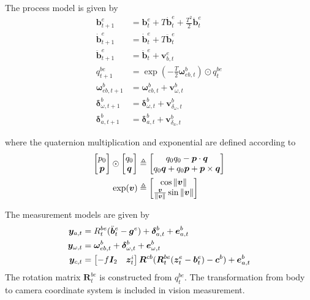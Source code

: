 The process model is given by
\begin{subequations}\label{eq:proc1}
	\begin{align}
	\bm{b}_{t+1}^{e} &= \bm{b}_{t}^{e} + T \dot{\bm{b}}_{t}^{e} + \tfrac {T^{2}} {2} \ddot{\bm{b}}_{t}^{e} \\
	\dot{\bm{b}}_{t+1}^{e} &= \dot{\bm{b}}_{t}^{e} + T \ddot{\bm{b}}_{t}^{e} \\
	\ddot{\bm{b}}_{t+1}^{e} &= \ddot{\bm{b}}_{t}^{e} + \bm{v}_{b,t}^{e} \\
	q_{t+1}^{be} &= \exp( -\tfrac{T}{2} \bm{\omega}_{eb,t}^{b} ) \odot q_{t}^{be} \\
	\bm{\omega}_{eb,t+1}^{b} &= \bm{\omega}_{eb,t}^{b} + \bm{v}_{\omega,t}^{b} \\
	\bm{\delta}_{\omega,t+1}^{b} &= \bm{\delta}_{\omega,t}^{b} + \bm{v}_{\delta_{\omega},t}^{b} \\
	\bm{\delta}_{a,t+1}^{b} &= \bm{\delta}_{a,t}^{b} + \bm{v}_{\delta_{a},t}^{b}
	\end{align}
\end{subequations}

where the quaternion multiplication and exponential are defined according to
\begin{subequations}
	\begin{align}
	\begin{bmatrix} p_{0} \\ \bm{p} \end{bmatrix} \odot \begin{bmatrix} q_{0} \\ \bm{q} \end{bmatrix} &\triangleq \begin{bmatrix} q_{0} q_{0} - \bm{p} \cdot \bm{q} \\ q_{0} \bm{q} + q_{0} \bm{p} + \bm{p} \times \bm{q} \end{bmatrix} \\
	\exp( \bm{v} ) &\triangleq \begin{bmatrix} \cos \| \bm{v} \| \\ \tfrac { \bm{v} }{ \| \bm{v} \| } \sin \| \bm{v} \| \end{bmatrix}
	\end{align}
\end{subequations}

The measurement models are given by
\begin{subequations}
	\begin{align}
	\bm{y}_{a,t} &= R_{t}^{be} ( \ddot{\bm{b}}_{t}^{e} - \bm{g}^{e} ) + \bm{\delta}_{a,t}^{b} + \bm{e}_{a,t}^{b} \\
	\bm{y}_{\omega,t} &= \bm{\omega}_{eb,t}^{b} + \bm{\delta}_{\omega,t}^{b} + \bm{e}_{\omega,t}^{b} \\
	\bm{y}_{c,t} &= \begin{bmatrix} -f\bm{I}_{2} & \bm{z}_{t}^{i} \end{bmatrix} \bm{R}^{cb} ( \bm{R}_{t}^{be} ( \bm{z}_{t}^{e} - \bm{b}_{t}^{e} ) - \bm{c}^{b} )  + \bm{e}_{a,t}^{b}
	\end{align}
\end{subequations}
The rotation matrix $ \bm{R}_{t}^{be} $ is constructed from $ q_{t}^{be} $. The transformation from body to camera coordinate system is included in vision measurement.

